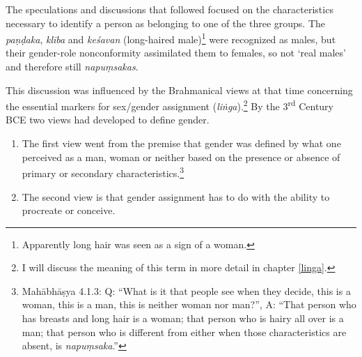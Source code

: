 The speculations and discussions that followed focused on the characteristics necessary to identify a person as belonging to one of the three groups. The {\em paṇḍaka}, {\em klība} and {\em keśavan} (long-haired male)\footnote{Apparently long hair was seen as a sign of a woman.} were recognized as males, but their gender-role nonconformity assimilated them to females, so not `real males' and therefore still {\em napuṃsakas}.

This discussion was influenced by the Brahmanical views at that time concerning the essential markers for sex/gender assignment ({\em liṅga}).\footnote{I will discuss the meaning of this term in more detail in chapter \ref{linga}.} By the 3\textsuperscript{rd} Century BCE two views had developed to define gender.

\begin{enumerate}
 \item The first view went from the premise that gender was defined by what one perceived as a man, woman or neither based on the presence or absence of primary or secondary characteristics.\footnote{Mahābhāṣya 4.1.3: Q: ``What is it that people see when they decide, this is a woman, this is a man, this is neither woman nor man?'', A: ``That person who has breasts and long hair is a woman; that person who is hairy all over is a man; that person who is different from either when those characteristics are absent, is {\em napuṃsaka}.''}
 \item The second view is that gender assignment has to do with the ability to procreate or conceive. 
\end{enumerate}

